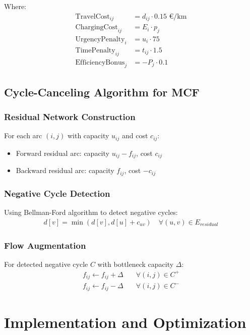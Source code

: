 \documentclass[12pt,a4paper]{article}
\begin{document}
Where:
\begin{align}
\text{TravelCost}_{ij} &= d_{ij} \cdot 0.15 \text{ €/km} \\
\text{ChargingCost}_{ij} &= E_i \cdot p_j \\
\text{UrgencyPenalty}_i &= u_i \cdot 75 \\
\text{TimePenalty}_{ij} &= t_{ij} \cdot 1.5 \\
\text{EfficiencyBonus}_j &= -P_j \cdot 0.1
\end{align}

\subsection{Cycle-Canceling Algorithm for MCF}

\subsubsection{Residual Network Construction}
For each arc $(i,j)$ with capacity $u_{ij}$ and cost $c_{ij}$:
\begin{itemize}
    \item Forward residual arc: capacity $u_{ij} - f_{ij}$, cost $c_{ij}$
    \item Backward residual arc: capacity $f_{ij}$, cost $-c_{ij}$
\end{itemize}

\subsubsection{Negative Cycle Detection}
Using Bellman-Ford algorithm to detect negative cycles:
\begin{align}
d[v] = \min(d[v], d[u] + c_{uv}) \quad \forall (u,v) \in E_{residual}
\end{align}

\subsubsection{Flow Augmentation}
For detected negative cycle $C$ with bottleneck capacity $\Delta$:
\begin{align}
f_{ij} \leftarrow f_{ij} + \Delta \quad &\forall (i,j) \in C^+ \\
f_{ij} \leftarrow f_{ij} - \Delta \quad &\forall (i,j) \in C^-
\end{align}

\section{Implementation and Optimization}
\end{document}
